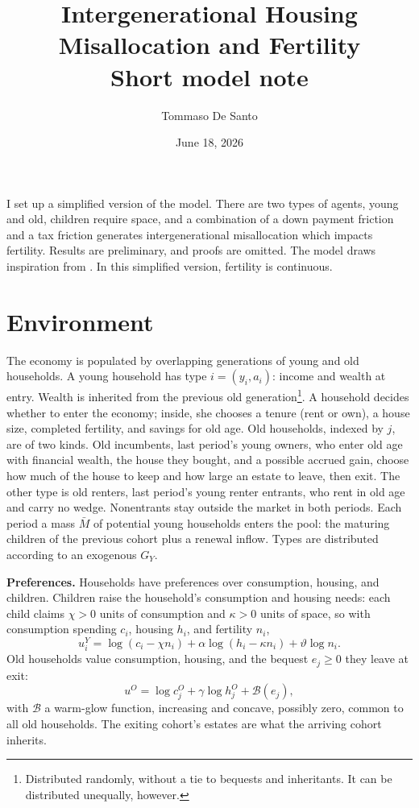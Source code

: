 \documentclass[11pt]{article}
\title{Intergenerational Housing Misallocation and Fertility\\[-0.1em]
\large Short model note}
\author{Tommaso De Santo}
\date{June 18, 2026}
\begin{document}
\maketitle
I set up a simplified version of the model. There are two types of agents, young and old, children require space, and a combination of a down payment friction and a tax friction generates intergenerational misallocation which impacts fertility. Results are preliminary, and proofs are omitted. The model draws inspiration from \citet{coven2024}. In this simplified version, fertility is continuous.

\section{Environment}

The economy is populated by overlapping generations of young and old households. A young household has type $i=(y_i,a_i)$: income and wealth at entry. Wealth is inherited from the previous old generation\footnote{Distributed randomly, without a tie to bequests and inheritants. It can be distributed unequally, however.}. A household decides whether to enter the economy; inside, she chooses a tenure (rent or own), a house size, completed fertility, and savings for old age. Old households, indexed by $j$, are of two kinds. Old incumbents, last period's young owners, who enter old age with financial wealth, the house they bought, and a possible accrued gain, choose how much of the house to keep and how large an estate to leave, then exit. The other type is old renters, last period's young renter entrants, who rent in old age and carry no wedge. Nonentrants stay outside the market in both periods. Each period a mass $\bar M$ of potential young households enters the pool: the maturing children of the previous cohort plus a renewal inflow. Types are distributed according to an exogenous $G_Y$.

\textbf{Preferences.} Households have preferences over consumption, housing, and children. Children raise the household's consumption and housing needs: each child claims $\chi>0$ units of consumption and $\kappa>0$ units of space, so with consumption spending $c_i$, housing $h_i$, and fertility $n_i$,
\[
u_i^Y=\log(c_i-\chi n_i)+\alpha\log(h_i-\kappa n_i)+\vartheta\log n_i .
\]
Old households value consumption, housing, and the bequest $e_j\ge0$ they leave at exit:
\[
u^O=\log c_j^O+\gamma\log h_j^O+\mathcal B(e_j),
\]
with $\mathcal B$ a warm-glow function, increasing and concave, possibly zero, common to all old households. The exiting cohort's estates are what the arriving cohort inherits. 
\end{document}
